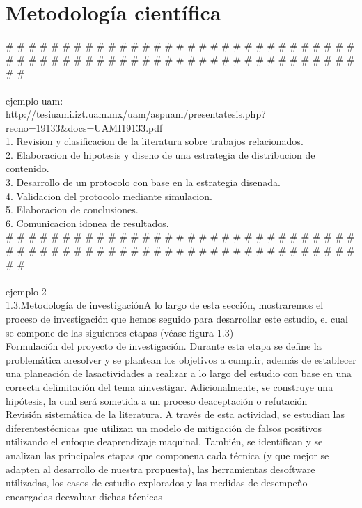 \section {Metodología científica}
\# \# \# \# \# \# \# \# \# \# \# \# \# \# \# \# \# \# \# \# \# \# \# \# \# \# \# \# \# \# \# \# \# \# \# \# \# \# \# \# \# \# \# \# \# \# \# \# \# \# \# \# \# \# \# \# \# \# \# \# \# \# \# \#\\\\
ejemplo uam:\\
http://tesiuami.izt.uam.mx/uam/aspuam/presentatesis.php?recno=19133\&docs=UAMI19133.pdf\\
1. Revision y clasificacion de la literatura sobre trabajos relacionados.\\
2. Elaboracion de hipotesis y diseno de una estrategia de distribucion de contenido.\\
3. Desarrollo de un protocolo con base en la estrategia disenada.\\
4. Validacion del protocolo mediante simulacion.\\
5. Elaboracion de conclusiones.\\
6. Comunicacion idonea de resultados.\\
\# \# \# \# \# \# \# \# \# \# \# \# \# \# \# \# \# \# \# \# \# \# \# \# \# \# \# \# \# \# \# \# \# \# \# \# \# \# \# \# \# \# \# \# \# \# \# \# \# \# \# \# \# \# \# \# \# \# \# \# \# \# \# \#\\\\
ejemplo 2\\
1.3.Metodología de investigaciónA lo largo de esta sección, mostraremos el proceso de investigación que hemos seguido para desarrollar este estudio, el cual se compone de las siguientes etapas (véase figura 1.3)\\
Formulación del proyecto de investigación. Durante esta etapa se define la problemática aresolver y se plantean los objetivos a cumplir, además de establecer una planeación de lasactividades a realizar a lo largo del estudio con base en una correcta delimitación del tema ainvestigar. Adicionalmente, se construye una hipótesis, la cual será sometida a un proceso deaceptación o refutación\\
Revisión sistemática de la literatura. A través de esta actividad, se estudian las diferentestécnicas que utilizan un modelo de mitigación de falsos positivos utilizando el enfoque deaprendizaje maquinal. También, se identifican y se analizan las principales etapas que componena cada técnica (y que mejor se adapten al desarrollo de nuestra propuesta), las herramientas desoftware utilizadas, los casos de estudio explorados y las medidas de desempeño encargadas deevaluar dichas técnicas\\

